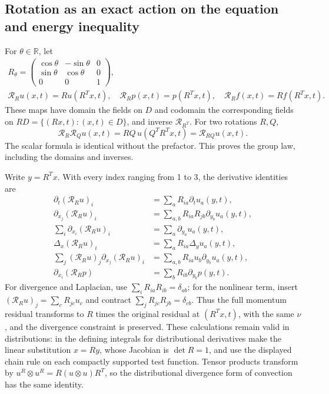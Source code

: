 \subsection{Rotation as an exact action on the equation and energy inequality}

For $\theta\in\mathbb R$, let
\begin{equation}\label{eq:ckn-rotation}
 \begin{gathered}
 R_\theta=\begin{pmatrix}
 \cos\theta&-\sin\theta&0\\
 \sin\theta&\cos\theta&0\\0&0&1
 \end{pmatrix},\\
 \mathcal R_Ru(x,t)=R u(R^Tx,t),\quad
 \mathcal R_Rp(x,t)=p(R^Tx,t),\quad
 \mathcal R_Rf(x,t)=R f(R^Tx,t).
 \end{gathered}
\end{equation}
These maps have domain the fields on $D$ and codomain the corresponding
fields on $RD=\{(Rx,t):(x,t)\in D\}$, and inverse $\mathcal R_{R^T}$.
For two rotations $R,Q$,
\[
 \mathcal R_R\mathcal R_Qu(x,t)=RQ\,u(Q^TR^Tx,t)
 =\mathcal R_{RQ}u(x,t).
\]
The scalar formula is identical without the prefactor. This proves the
group law, including the domains and inverses.

Write $y=R^Tx$. With every index ranging from 1 to 3, the derivative
identities are
\begin{align}\label{eq:ckn-rotation-components}
 \partial_t(\mathcal R_Ru)_i&=\sum_aR_{ia}\partial_tu_a(y,t),\nonumber\\
 \partial_{x_j}(\mathcal R_Ru)_i
 &=\sum_{a,b}R_{ia}R_{jb}\partial_{y_b}u_a(y,t),\nonumber\\
 \sum_i\partial_{x_i}(\mathcal R_Ru)_i
 &=\sum_a\partial_{y_a}u_a(y,t),\nonumber\\
 \Delta_x(\mathcal R_Ru)_i&=\sum_aR_{ia}\Delta_yu_a(y,t),\nonumber\\
 \sum_j(\mathcal R_Ru)_j\partial_{x_j}(\mathcal R_Ru)_i
 &=\sum_{a,b}R_{ia}u_b\partial_{y_b}u_a(y,t),\nonumber\\
 \partial_{x_i}(\mathcal R_Rp)&=\sum_bR_{ib}\partial_{y_b}p(y,t).
\end{align}
For divergence and Laplacian, use $\sum_iR_{ia}R_{ib}=\delta_{ab}$;
for the nonlinear term, insert
$(\mathcal R_Ru)_j=\sum_cR_{jc}u_c$ and contract
$\sum_jR_{jc}R_{jb}=\delta_{cb}$. Thus the full momentum residual
transforms to $R$ times the original residual at $(R^Tx,t)$, with the
same $\nu$, and the divergence constraint is preserved.
These calculations remain valid in distributions: in the defining
integrals for distributional derivatives make the linear substitution
$x=Ry$, whose Jacobian is $\det R=1$, and use the displayed chain rule
on each compactly supported test function. Tensor products transform
by $u^R\otimes u^R=R(u\otimes u)R^T$, so the distributional
divergence form of convection has the same identity.

